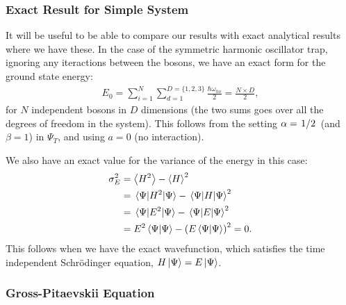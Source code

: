 \documentclass[a4paper, 11pt]{article}
\begin{document}
\begin{multicols}{2}
\subsubsection{Exact Result for Simple System}

It will be useful to be able to compare our results with exact analytical
results where we have these. In the case of the symmetric harmonic oscillator
trap, ignoring any iteractions between the bosons, we have an exact form for the
ground state energy:
\begin{align}
    E_0 = \sum_{i=1}^N\sum_{d=1}^{D=\{1,2,3\}} \frac{\hbar \omega_{ho}}{2} 
    = \frac{N\times D}{2},\label{eq:exact-ground-state}
\end{align}
for $N$ independent bosons in $D$ dimensions (the two sums goes
over all the degrees of freedom in the system). This follows from the setting
$\alpha=\flatfrac{1}{2}$ (and $\beta=1$) in $\Psi_T$, and using $a=0$ (no
interaction). 

We also have an exact value for the variance of the energy in this case:
\begin{align}
    \begin{split}
        \sigma_E^2 &= \expval{H^2} - \expval{H}^2\\
            &= \expval{H^2}{\Psi}-\expval{H}{\Psi}^2\\
            &= \expval{E^2}{\Psi}-\expval{E}{\Psi}^2\\
            &= E^2\braket{\Psi} - \qty(E\braket{\Psi})^2= 0.
    \end{split}\label{eq:var-zero-when-exact}
\end{align}
This follows when we have the exact wavefunction, which satisfies the time
independent Schrödinger equation, $H\ket{\Psi}=E\ket{\Psi}$.


\subsubsection{Gross-Pitaevskii Equation}


\end{multicols}
\end{document}
